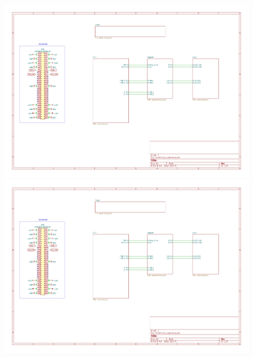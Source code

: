 \documentclass[11pt, a4paper, listof=numbered, captions=tableheading, headinclude, table, xcdraw]{scrreprt}
\begin{document}
\includegraphics[page=4,angle=90,width=\textwidth]{schematics/Electronic_Load.pdf}\newpage
\includegraphics[page=5,angle=90,width=\textwidth]{schematics/Electronic_Load.pdf}
\end{document}
